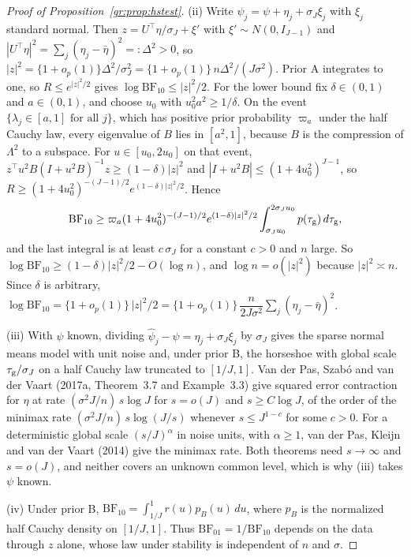 \begin{proof}[Proof of Proposition~\ref{gr:prop:hstest}]
(ii) Write $\hat\psi_j=\psi+\eta_j+\sigma_J\xi_j$ with $\xi_j$ standard normal. Then $z=U^{\top}\eta/\sigma_J+\xi'$ with $\xi'\sim N(0,I_{J-1})$ and $|U^{\top}\eta|^2=\sum_j(\eta_j-\bar\eta)^2=:\Delta^2>0$, so $|z|^2=\{1+o_p(1)\}\Delta^2/\sigma_J^2=\{1+o_p(1)\}\,n\Delta^2/(J\sigma^2)$. Prior A integrates to one, so $R\le e^{|z|^2/2}$ gives $\log\mathrm{BF}_{10}\le|z|^2/2$. For the lower bound fix $\delta\in(0,1)$ and $a\in(0,1)$, and choose $u_0$ with $u_0^2a^2\ge1/\delta$. On the event $\{\lambda_j\in[a,1]\text{ for all }j\}$, which has positive prior probability $\varpi_a$ under the half Cauchy law, every eigenvalue of $B$ lies in $[a^2,1]$, because $B$ is the compression of $\Lambda^2$ to a subspace. For $u\in[u_0,2u_0]$ on that event, $z^{\top}u^2B(I+u^2B)^{-1}z\ge(1-\delta)|z|^2$ and $|I+u^2B|\le(1+4u_0^2)^{J-1}$, so $R\ge(1+4u_0^2)^{-(J-1)/2}e^{(1-\delta)|z|^2/2}$. Hence
\[
\mathrm{BF}_{10}\ge\varpi_a(1+4u_0^2)^{-(J-1)/2}e^{(1-\delta)|z|^2/2}\int_{\sigma_Ju_0}^{2\sigma_Ju_0}p(\tau_{\mathrm{g}})\,d\tau_{\mathrm{g}},
\]
and the last integral is at least $c\,\sigma_J$ for a constant $c>0$ and $n$ large. So $\log\mathrm{BF}_{10}\ge(1-\delta)|z|^2/2-O(\log n)$, and $\log n=o(|z|^2)$ because $|z|^2\asymp n$. Since $\delta$ is arbitrary, $\log\mathrm{BF}_{10}=\{1+o_p(1)\}\,|z|^2/2=\{1+o_p(1)\}\,\dfrac{n}{2J\sigma^2}\sum_j(\eta_j-\bar\eta)^2$.

(iii) With $\psi$ known, dividing $\hat\psi_j-\psi=\eta_j+\sigma_J\xi_j$ by $\sigma_J$ gives the sparse normal means model with unit noise and, under prior B, the horseshoe with global scale $\tau_{\mathrm{g}}/\sigma_J$ on a half Cauchy law truncated to $[1/J,1]$. Van der Pas, Szab\'o and van der Vaart (2017a, Theorem~3.7 and Example~3.3) give squared error contraction for $\eta$ at rate $(\sigma^2J/n)\,s\log J$ for $s=o(J)$ and $s\ge C\log J$, of the order of the minimax rate $(\sigma^2J/n)\,s\log(J/s)$ whenever $s\le J^{1-c}$ for some $c>0$. For a deterministic global scale $(s/J)^{\alpha}$ in noise units, with $\alpha\ge1$, van der Pas, Kleijn and van der Vaart (2014) give the minimax rate. Both theorems need $s\to\infty$ and $s=o(J)$, and neither covers an unknown common level, which is why (iii) takes $\psi$ known.

(iv) Under prior B, $\mathrm{BF}_{10}=\int_{1/J}^{1}r(u)p_B(u)\,du$, where $p_B$ is the normalized half Cauchy density on $[1/J,1]$. Thus $\mathrm{BF}_{01}=1/\mathrm{BF}_{10}$ depends on the data through $z$ alone, whose law under stability is independent of $n$ and $\sigma$.
\end{proof}

